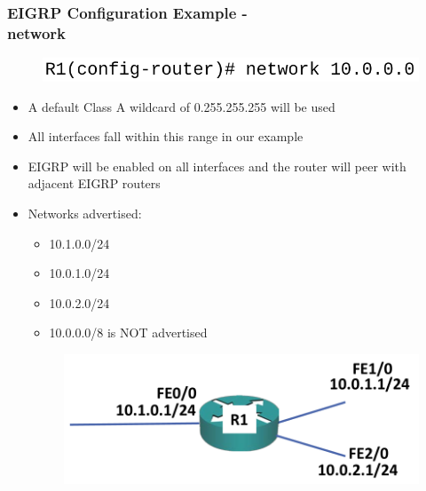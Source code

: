 \documentclass[pdflatex,compress,mathserif]{beamer}
\begin{document}
\begin{frame}
	\frametitle{EIGRP Configuration Example -\\ network}
	\begin{figure}
		\centering
		\includegraphics[width=0.8\linewidth]{img/img14}
	\end{figure}
	\begin{itemize}
		\item A default Class A wildcard of 0.255.255.255 will be used
		\item All interfaces fall within this range in our example
		\item EIGRP will be enabled on all interfaces and the router will peer with
adjacent EIGRP routers
		\item Networks advertised:
		\begin{multicols}{2}
			\begin{itemize}
				\item 10.1.0.0/24
				\item 10.0.1.0/24
				\item 10.0.2.0/24
				\item 10.0.0.0/8 is NOT advertised
			\end{itemize}
			\columnbreak
			\begin{figure}
				\centering
				\includegraphics[width=\linewidth]{img/img15}
			\end{figure}
		\end{multicols}
	\end{itemize}
\end{frame}
\end{document}
